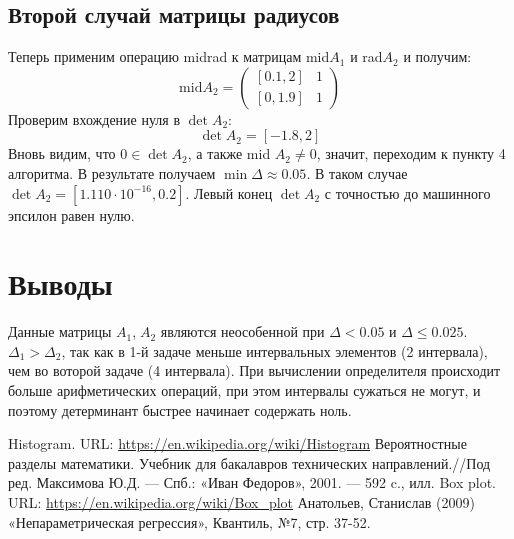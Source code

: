 \documentclass[a4paper,14pt]{article}
\begin{document}
	\subsection{Второй случай матрицы радиусов}
	Теперь применим операцию midrad к матрицам mid$A_1$ и rad$A_2$ и получим:
	\begin{equation}
		\text{mid} A_2 = \begin{pmatrix}
			[0.1,2] & 1\\ 
			[0,1.9] & 1
		\end{pmatrix}
	\end{equation}
	Проверим вхождение нуля в $\det A_2$:
	\begin{equation}
		\det A_2 = [-1.8,2]
	\end{equation}
	Вновь видим, что $0 \in \det A_2$, а также mid $A_2 \neq 0$, значит, переходим к пункту 4 алгоритма.
	В результате получаем $\min \Delta \approx 0.05$. В таком случае $\det A_2 = [1.110 \cdot 10^{-16}, 0.2]$. Левый конец $\det A_2$ с
	точностью до машинного эпсилон равен нулю.
	
	\section{Выводы}	
	Данные матрицы $A_1$,$\;A_2$ являются неособенной при $\Delta < 0.05$ и $\Delta \le 0.025$. $\Delta_1 > \Delta_2$, так как в 1-й задаче меньше интервальных элементов (2 интервала), чем во воторой задаче (4 интервала). При вычислении определителя происходит больше арифметических операций, при этом интервалы сужаться не могут, и поэтому детерминант быстрее начинает содержать ноль.
	\newpage
	
	\begin{thebibliography}{4}
		Histogram. URL: \url{https://en.wikipedia.org/wiki/Histogram}
		Вероятностные разделы математики. Учебник для бакалавров технических направлений.//Под ред. Максимова Ю.Д. --- Спб.: «Иван Федоров», 2001. --- 592 c., илл.
		Box plot. URL: \url{https://en.wikipedia.org/wiki/Box_plot}
		Анатольев, Станислав (2009) «Непараметрическая регрессия», Квантиль, №7, стр. 37-52.
	\end{thebibliography}
	
\end{document}
